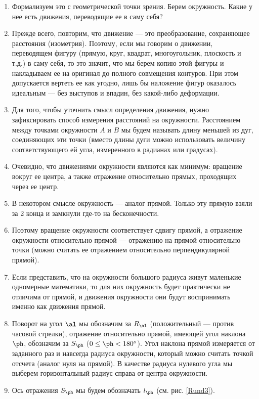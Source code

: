 \begin{enumerate}
\item Формализуем это с геометрической точки зрения. Берем окружность. Какие у нее есть движения, переводящие ее в саму себя?
\item Прежде всего, повторим, что движение --- это преобразование, сохраняющее расстояния (изометрия). Поэтому, если мы говорим о движении, переводящем фигуру (прямую, круг, квадрат, многоугольник, плоскость и т.д.) в саму себя, то это значит, что мы берем копию этой фигуры и накладываем ее на оригинал до полного совмещения контуров. При этом допускается вертеть ее как угодно, лишь бы наложение фигур оказалось идеальным --- без выступов и впадин, без какой-либо деформации.
\item Для того, чтобы уточнить смысл определения движения, нужно зафиксировать способ измерения расстояний на окружности.  Расстоянием между точками окружности $A$ и $B$ мы будем называть длину меньшей из дуг, соединяющих эти точки (вместо длины дуги можно использовать величину соответствующего ей угла, измеренного в радианах или градусах).
\item Очевидно, что движениями окружности являются как минимум: вращение вокруг ее центра, а также отражение относительно прямых, проходящих через ее центр.
\item В некотором смысле окружность --- аналог прямой. Только эту прямую взяли за 2 конца и замкнули где-то на бесконечности.
\item Поэтому вращение окружности соответствует сдвигу прямой, а отражение окружности относительно прямой --- отражению на прямой относительно точки (можно считать ее отражением относительно перпендикулярной прямой).
\item Если представить, что на окружности большого радиуса живут маленькие одномерные математики, то для них окружность будет практически не отличима от прямой, и движения окружности они будут воспринимать именно как движения прямой.
\item Поворот на угол $\al$ мы обозначим за $R_\al$ (положительный --- против часовой стрелки), отражение относительно прямой, имеющей угол наклона $\ph$, обозначим за $S_\ph$ ($0\le\ph<180^o$). Угол наклона прямой измеряется от заданного раз и навсегда радиуса окружности, который можно считать точкой отсчета (аналог нуля на прямой). В качестве радиуса нулевого угла мы выберем горизонтальный радиус справа от центра окружности.
\item Ось отражения $S_\ph$ мы будем обозначать $l_\ph$ (см. рис. \ref{Rund3}).


\end{enumerate}
